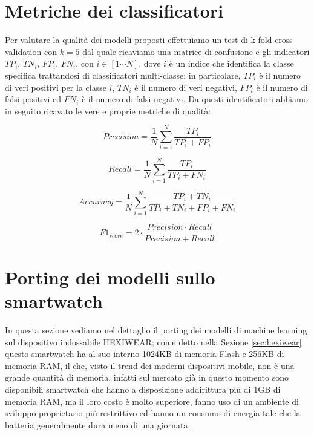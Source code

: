 \section{Metriche dei classificatori}
\label{sec:metriche-dei-classificatori}

Per valutare la qualità dei modelli proposti effettuiamo un test di k-fold cross-validation con $k=5$ dal quale ricaviamo una matrice di confusione e gli indicatori $TP_i$, $TN_i$, $FP_i$, $FN_i$, con $i \in [1\cdots N]$, dove $i$ è un indice che identifica la classe specifica trattandosi di classificatori multi-classe; in particolare, $TP_i$ è il numero di veri positivi per la classe $i$, $TN_i$ è il numero di veri negativi, $FP_i$ è il numero di falsi positivi ed $FN_i$ è il numero di falsi negativi. Da questi identificatori abbiamo in seguito ricavato le vere e proprie metriche di qualità: 

\begin{equation}
    Precision = \dfrac{1}{N} \sum_{i=1}^{N} \dfrac{TP_i}{TP_i + FP_i}
    \label{eq:precision}
\end{equation}

\begin{equation}
    Recall = \dfrac{1}{N} \sum_{i=1}^{N} \dfrac{TP_i}{TP_i + FN_i}
    \label{eq:recall}
\end{equation}

\begin{equation}
    Accuracy = \dfrac{1}{N} \sum_{i=1}^{N} \dfrac{TP_i + TN_i}{TP_i + TN_i + FP_i + FN_i}    
    \label{eq:accuracy}
\end{equation}

\begin{equation}
    F1_{score} = 2 \cdot \dfrac{Precision \cdot Recall}{Precision + Recall}
    \label{eq:f1}
\end{equation}

\section{Porting dei modelli sullo smartwatch}
\label{sec:porting-dei-modelli-sullo-smartwatch}

In questa sezione vediamo nel dettaglio il porting dei modelli di machine learning sul dispositivo indossabile HEXIWEAR; come detto nella Sezione \ref{sec:hexiwear} questo smartwatch ha al suo interno 1024KB di memoria Flash e 256KB di memoria RAM, il che, visto il trend dei moderni dispositivi mobile, non è una grande quantità di memoria, infatti sul mercato già in questo momento sono disponibili smartwatch che hanno a disposizione addirittura più di 1GB di memoria RAM, ma il loro costo è molto superiore, fanno uso di un ambiente di sviluppo proprietario più restrittivo ed hanno un consumo di energia tale che la batteria generalmente dura meno di una giornata.

